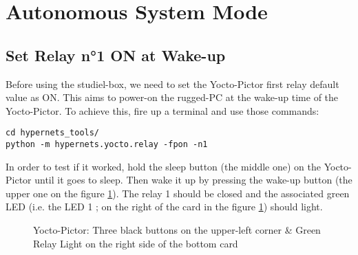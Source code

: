 \section{Autonomous System Mode}

\subsection{Set Relay n°1 ON at Wake-up}

Before using the studiel-box, we need to set the Yocto-Pictor first 
relay default value as ON. This aims to power-on the rugged-PC at the wake-up time
of the Yocto-Pictor. To achieve this, fire up a terminal and use those commands:
\begin{lstlisting}
cd hypernets_tools/
python -m hypernets.yocto.relay -fpon -n1
\end{lstlisting}

\noindent In order to test if it worked, hold the sleep button (the middle
one) on the Yocto-Pictor until it goes to sleep. Then wake it up by pressing 
the wake-up button (the upper one on the figure \ref{fig:yoctoSleep}). 
The relay 1 should be closed and the associated green LED (i.e. the LED 1 ; on the 
right of the card in the figure \ref{fig:yoctoSleep}) should light.

\begin{figure}[h!]
	\centering
	\caption{Yocto-Pictor: Three black buttons on the upper-left corner 
			 \& Green Relay Light on the right side of the bottom card}
	\label{fig:yoctoSleep}
\end{figure}
\FloatBarrier

